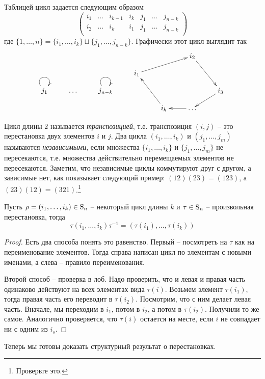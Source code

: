 Таблицей цикл задается следующим образом
\[
\begin{pmatrix}
{i_1}&{\ldots}&{i_{k-1}}&{i_k}&{j_1}&{\ldots}&{j_{n-k}}\\
{i_2}&{\ldots}&{i_k}&{i_1}&{j_{1}}&{\ldots}&{j_{n-k}}\\
\end{pmatrix}
\]
где $\{1,\ldots,n\} = \{i_1,\ldots,i_k\}\sqcup\{j_1,\ldots,j_{n-k}\}$. Графически этот цикл выглядит так
\[
\xymatrix@R=10pt{
	{}&{}&{}&{}&{}&{i_2}\ar[rdd]&{}\\
	{}&{}&{}&{i_1}\ar[urr]&{}&{}&{}\\
	{j_1}\ar@(ul,ur)&{\ldots}&{j_{n-k}}\ar@(ul,ur)&{}&{}&{}&{i_3}\ar[dl]\\
	{}&{}&{}&{}&{i_k}\ar[uul]&{\ldots}\ar[l]&{}\\
}
\]


Цикл длины $2$ называется {\it транспозицией}, т.е. транспозиция $(i,j)$ -- это перестановка двух элементов $i$ и $j$. Два цикла $(i_1,\ldots,i_k)$ и $(j_1,\ldots,j_m)$ называются {\it независимыми}, если множества $\{i_1,\ldots,i_k\}$ и $\{j_1,\ldots,j_m\}$ не пересекаются, т.е. множества действительно перемещаемых элементов не пересекаются. Заметим, что независимые циклы коммутируют друг с другом, а зависимые нет, как показывает следующий пример: $(12)(23) = (123)$, а $(23)(12) = (321)$.\footnote{Проверьте это.}

\begin{claim}\label{claim:CycleRename}
Пусть $\rho = (i_1,\ldots, i_k)\in\operatorname{S}_{n}$ -- некоторый цикл длины $k$ и $\tau\in\operatorname{S}_{n}$ -- произвольная перестановка, тогда 
\[
\tau(i_1,\ldots,i_k)\tau^{-1} = (\tau(i_1),\ldots,\tau(i_k))
\]
\end{claim}
\begin{proof}
Есть два способа понять это равенство. Первый -- посмотреть на $\tau$ как на переименование элементов. Тогда справа написан цикл по элементам с новыми именами, а слева -- правило переименования.

Второй способ -- проверка в лоб. Надо проверить, что и левая и правая часть одинаково действуют на всех элементах вида $\tau(i)$. Возьмем элемент $\tau(i_1)$, тогда правая часть его переводит в $\tau(i_2)$. Посмотрим, что с ним делает левая часть. Вначале, мы переходим в $i_1$, потом в $i_2$, а потом в $\tau(i_2)$. Получили то же самое. Аналогично проверяется, что $\tau(i)$ остается на месте, если $i$ не совпадает ни с одним из $i_s$.
\end{proof}

Теперь мы готовы доказать структурный результат о перестановках.

